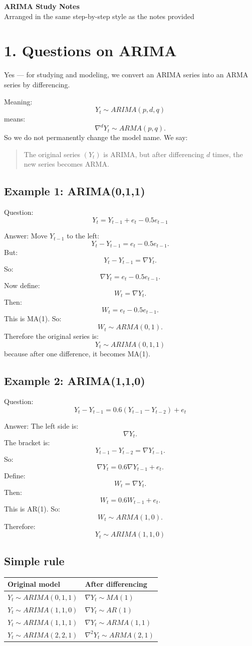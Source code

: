 \documentclass[11pt]{article}
\begin{document}
\begin{center}
{\LARGE \textbf{ARIMA Study Notes}}\\[4pt]
{\large Arranged in the same step-by-step style as the notes provided}
\end{center}

\section*{1. Questions on ARIMA}
Yes --- for studying and modeling, we convert an ARIMA series into an ARMA series by differencing.

Meaning:
\[
Y_t \sim ARIMA(p,d,q)
\]
means:
\[
\nabla^d Y_t \sim ARMA(p,q).
\]
So we do not permanently change the model name. We say:

\begin{quote}
The original series $(Y_t)$ is ARIMA, but after differencing $d$ times, the new series becomes ARMA.
\end{quote}

\subsection*{Example 1: ARIMA(0,1,1)}
Question:
\[
Y_t = Y_{t-1} + e_t - 0.5e_{t-1}
\]

Answer:
Move $Y_{t-1}$ to the left:
\[
Y_t - Y_{t-1} = e_t - 0.5e_{t-1}.
\]
But:
\[
Y_t - Y_{t-1} = \nabla Y_t.
\]
So:
\[
\nabla Y_t = e_t - 0.5e_{t-1}.
\]
Now define:
\[
W_t = \nabla Y_t.
\]
Then:
\[
W_t = e_t - 0.5e_{t-1}.
\]
This is MA(1). So:
\[
W_t \sim ARMA(0,1).
\]
Therefore the original series is:
\[
\boxed{Y_t \sim ARIMA(0,1,1)}
\]
because after one difference, it becomes MA(1).

\subsection*{Example 2: ARIMA(1,1,0)}
Question:
\[
Y_t - Y_{t-1} = 0.6(Y_{t-1} - Y_{t-2}) + e_t
\]

Answer:
The left side is:
\[
\nabla Y_t.
\]
The bracket is:
\[
Y_{t-1} - Y_{t-2} = \nabla Y_{t-1}.
\]
So:
\[
\nabla Y_t = 0.6\nabla Y_{t-1} + e_t.
\]
Define:
\[
W_t = \nabla Y_t.
\]
Then:
\[
W_t = 0.6W_{t-1} + e_t.
\]
This is AR(1). So:
\[
W_t \sim ARMA(1,0).
\]
Therefore:
\[
\boxed{Y_t \sim ARIMA(1,1,0)}
\]

\subsection*{Simple rule}
\begin{center}
\begin{tabular}{@{}ll@{}}
\toprule
Original model & After differencing \\
\midrule
$Y_t \sim ARIMA(0,1,1)$ & $\nabla Y_t \sim MA(1)$ \\
$Y_t \sim ARIMA(1,1,0)$ & $\nabla Y_t \sim AR(1)$ \\
$Y_t \sim ARIMA(1,1,1)$ & $\nabla Y_t \sim ARMA(1,1)$ \\
$Y_t \sim ARIMA(2,2,1)$ & $\nabla^2 Y_t \sim ARMA(2,1)$ \\
\bottomrule
\end{tabular}
\end{center}
\end{document}
